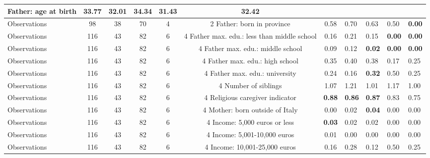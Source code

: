 \begin{tabular}{l c c c c c c }
Father: age at birth &     33.77 &     32.01 & \textbf{    34.34} &     31.43 &     32.42 \\
\midrule
Observations &        98 &        38 &        70 &         4 &         2
Father: born in province &      0.58 &      0.70 &      0.63 &      0.50 & \textbf{     0.00} \\
\midrule
Observations &       116 &        43 &        82 &         6 &         4
Father max. edu.: less than middle school &      0.16 &      0.21 &      0.15 & \textbf{     0.00} & \textbf{     0.00} \\
\midrule
Observations &       116 &        43 &        82 &         6 &         4
Father max. edu.: middle school &      0.09 &      0.12 & \textbf{     0.02} & \textbf{     0.00} & \textbf{     0.00} \\
\midrule
Observations &       116 &        43 &        82 &         6 &         4
Father max. edu.: high school &      0.35 &      0.40 &      0.38 &      0.17 &      0.25 \\
\midrule
Observations &       116 &        43 &        82 &         6 &         4
Father max. edu.: university &      0.24 &      0.16 & \textbf{     0.32} &      0.50 &      0.25 \\
\midrule
Observations &       116 &        43 &        82 &         6 &         4
Number of siblings &      1.07 &      1.21 &      1.01 &      1.17 &      1.00 \\
\midrule
Observations &       116 &        43 &        82 &         6 &         4
Religious caregiver indicator & \textbf{     0.88} & \textbf{     0.86} & \textbf{     0.87} &      0.83 &      0.75 \\
\midrule
Observations &       116 &        43 &        82 &         6 &         4
Mother: born outside of Italy &      0.00 &      0.02 & \textbf{     0.04} &      0.00 &      0.00 \\
\midrule
Observations &       116 &        43 &        82 &         6 &         4
Income: 5,000 euros or less & \textbf{     0.03} &      0.02 &      0.02 &      0.00 &      0.00 \\
\midrule
Observations &       116 &        43 &        82 &         6 &         4
Income: 5,001-10,000 euros &      0.01 &      0.00 &      0.00 &      0.00 &      0.00 \\
\midrule
Observations &       116 &        43 &        82 &         6 &         4
Income: 10,001-25,000 euros &      0.16 &      0.28 &      0.12 &      0.50 &      0.25 \\
\midrule

\end{tabular}
